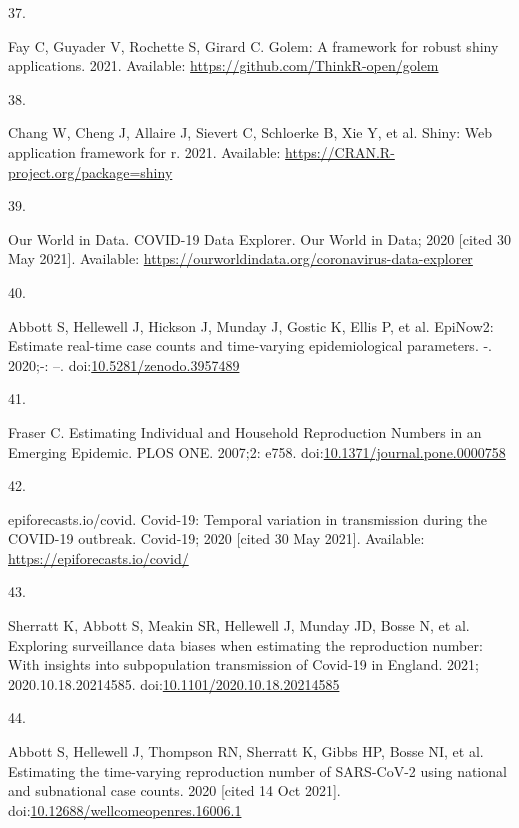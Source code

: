 \documentclass[10pt,letterpaper]{article}
\newlength{\cslhangindent}
\newlength{\csllabelwidth}
\newlength{\cslentryspacingunit} %
\newenvironment{CSLReferences}[2] %
 {%
  \setlength{\parindent}{0pt}
  \ifodd #1
  \let\oldpar\par
  \def\par{\hangindent=\cslhangindent\oldpar}
  \fi
  \setlength{\parskip}{#2\cslentryspacingunit}
 }%
 {}
\newcommand{\CSLLeftMargin}[1]{\parbox[t]{\csllabelwidth}{#1}}
\newcommand{\CSLRightInline}[1]{\parbox[t]{\linewidth - \csllabelwidth}{#1}\break}
\begin{document}
\begin{CSLReferences}{0}{0}
\leavevmode{}%
\CSLLeftMargin{37. }
\CSLRightInline{Fay C, Guyader V, Rochette S, Girard C. Golem: A
framework for robust shiny applications. 2021. Available:
\url{https://github.com/ThinkR-open/golem}}

\leavevmode{}%
\CSLLeftMargin{38. }
\CSLRightInline{Chang W, Cheng J, Allaire J, Sievert C, Schloerke B, Xie
Y, et al. Shiny: Web application framework for r. 2021. Available:
\url{https://CRAN.R-project.org/package=shiny}}

\leavevmode{}%
\CSLLeftMargin{39. }
\CSLRightInline{Our World in Data. {COVID-19 Data Explorer}. {Our World
in Data}; 2020 {[}cited 30 May 2021{]}. Available:
\url{https://ourworldindata.org/coronavirus-data-explorer}}

\leavevmode{}%
\CSLLeftMargin{40. }
\CSLRightInline{Abbott S, Hellewell J, Hickson J, Munday J, Gostic K,
Ellis P, et al. EpiNow2: Estimate real-time case counts and time-varying
epidemiological parameters. -. 2020;-: --.
doi:\href{https://doi.org/10.5281/zenodo.3957489}{10.5281/zenodo.3957489}}

\leavevmode{}%
\CSLLeftMargin{41. }
\CSLRightInline{Fraser C. Estimating {Individual} and {Household
Reproduction Numbers} in an {Emerging Epidemic}. PLOS ONE. 2007;2: e758.
doi:\href{https://doi.org/10.1371/journal.pone.0000758}{10.1371/journal.pone.0000758}}

\leavevmode{}%
\CSLLeftMargin{42. }
\CSLRightInline{epiforecasts.io/covid. Covid-19: {Temporal} variation in
transmission during the {COVID-19} outbreak. {Covid-19}; 2020 {[}cited
30 May 2021{]}. Available: \url{https://epiforecasts.io/covid/}}

\leavevmode{}%
\CSLLeftMargin{43. }
\CSLRightInline{Sherratt K, Abbott S, Meakin SR, Hellewell J, Munday JD,
Bosse N, et al. Exploring surveillance data biases when estimating the
reproduction number: With insights into subpopulation transmission of
{Covid-19} in {England}. 2021; 2020.10.18.20214585.
doi:\href{https://doi.org/10.1101/2020.10.18.20214585}{10.1101/2020.10.18.20214585}}

\leavevmode{}%
\CSLLeftMargin{44. }
\CSLRightInline{Abbott S, Hellewell J, Thompson RN, Sherratt K, Gibbs
HP, Bosse NI, et al. Estimating the time-varying reproduction number of
{SARS-CoV-2} using national and subnational case counts. 2020 {[}cited
14 Oct 2021{]}.
doi:\href{https://doi.org/10.12688/wellcomeopenres.16006.1}{10.12688/wellcomeopenres.16006.1}}


\end{CSLReferences}
\end{document}
